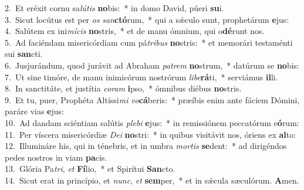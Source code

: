 {2.~}Et eréxit cornu sa\textit{lú}\textit{tis} \textbf{no}bis:~* in domo David, púeri \textbf{su}i.\\
{3.~}Sicut locútus est per \textit{os} \textit{san}\textbf{ctó}rum,~* qui a sǽculo sunt, prophetárum \textbf{e}jus:\\
{4.~}Salútem ex ini\textit{mí}\textit{cis} \textbf{no}stris,~* et de manu ómnium, qui o\textbf{dé}runt nos.\\
{5.~}Ad faciéndam misericórdiam cum pá\textit{tri}\textit{bus} \textbf{no}stris:~* et memorári testaménti sui \textbf{san}cti.\\
{6.~}Jusjurándum, quod jurávit ad Abraham \textit{pa}\textit{trem} \textbf{no}strum,~* datúrum se \textbf{no}bis:\\
{7.~}Ut sine timóre, de manu inimicórum nostrórum \textit{li}\textit{be}\textbf{rá}ti,~* serviámus \textbf{il}li.\\
{8.~}In sanctitáte, et justítia \textit{co}\textit{ram} \textbf{i}pso,~* ómnibus diébus \textbf{no}stris.\\
{9.~}Et tu, puer, Prophéta Altíssi\textit{mi} \textit{vo}\textbf{cá}beris:~* præíbis enim ante fáciem Dómini, paráre vias \textbf{e}jus:\\
{10.~}Ad dandam sciéntiam salútis \textit{ple}\textit{bi} \textbf{e}jus:~* in remissiónem peccatórum e\textbf{ó}rum:\\
{11.~}Per víscera misericórdiæ \textit{De}\textit{i} \textbf{no}stri:~* in quibus visitávit nos, óriens ex \textbf{al}to:\\
{12.~}Illumináre his, qui in ténebris, et in umbra \textit{mor}\textit{tis} \textbf{se}dent:~* ad dirigéndos pedes nostros in viam \textbf{pa}cis.\\
{13.~}Glória Pa\textit{tri}, \textit{et} \textbf{Fí}lio,~* et Spirítui \textbf{San}cto.\\
{14.~}Sicut erat in princípio, et \textit{nunc}, \textit{et} \textbf{sem}per,~* et in sǽcula sæculórum. \textbf{A}men.\\
